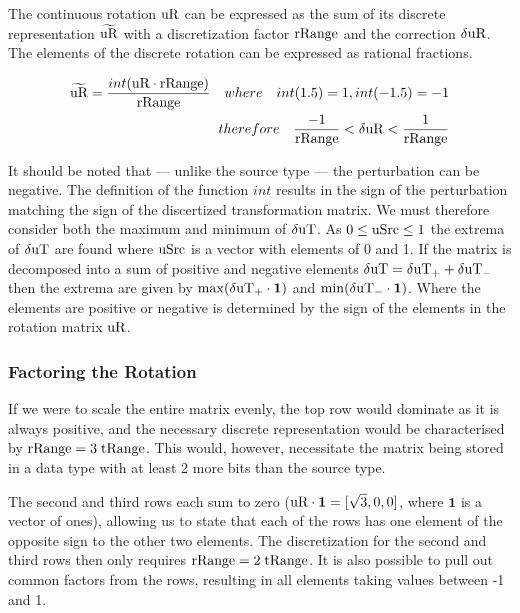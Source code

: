 The continuous rotation $\text{uR}$ can be expressed as the sum of its discrete representation $\widetilde{\text{uR}}$ with a discretization factor $\text{rRange}$ and the correction $\delta\text{uR}$. The elements of the discrete rotation can be expressed as rational fractions.

\begin{eqnarray}\label{eq:dRRange}
\widetilde{\text{uR}} = \dfrac{int(\text{uR} \cdot \text{rRange})}{\text{rRange}}\quad where\quad int(1.5) = 1, int (-1.5) = -1\\
therefore\quad \dfrac{-1}{\text{rRange}} < \delta\text{uR}  < \dfrac{1}{\text{rRange}}
\end{eqnarray}

It should be noted that --- unlike the source type \uSrc --- the perturbation can be negative. The definition of the function $int$ results in the sign of the perturbation matching the sign of the discertized transformation matrix. We must therefore consider both the maximum and minimum of $\delta\text{uT}$. As $0 \le\text{uSrc} \le 1$ the extrema of $\delta\text{uT}$ are found where $\text{uSrc}$ is a vector with elements of 0 and 1. If the matrix is decomposed into a sum of positive and negative elements $\delta\text{uT} = \delta\text{uT}_+ + \delta\text{uT}_-$ then the extrema are given by $\max(\delta\text{uT}_+ \cdot \mathbf{1})$ and $\min(\delta\text{uT}_- \cdot \mathbf{1})$. Where the elements are positive or negative is determined by the sign of the elements in the rotation matrix $\text{uR}$.

\subsubsection{Factoring the Rotation}

If we were to scale the entire matrix evenly, the top row would dominate as it is always positive, and the necessary discrete representation would be characterised by $\text{rRange} = 3 \; \text{tRange}$. This would, however, necessitate the matrix being stored in a data type with at least 2 more bits than the source type.

The second and third rows each sum to zero ($\text{uR} \cdot \mathbf{1} = [\sqrt{3},0,0]$, where $\mathbf{1}$ is a vector of ones), allowing us to state that each of the rows has one element of the opposite sign to the other two elements. The discretization for the second and third rows then only requires $\text{rRange} = 2 \; \text{tRange}$. It is also possible to pull out common factors from the rows, resulting in all elements taking values between -1 and 1.


